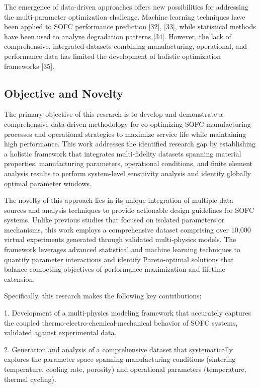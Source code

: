 \documentclass[10pt,conference]{IEEEtran}
\begin{document}
The emergence of data-driven approaches offers new possibilities for addressing the multi-parameter optimization challenge. Machine learning techniques have been applied to SOFC performance prediction [32], [33], while statistical methods have been used to analyze degradation patterns [34]. However, the lack of comprehensive, integrated datasets combining manufacturing, operational, and performance data has limited the development of holistic optimization frameworks [35].

\subsection{Objective and Novelty}

The primary objective of this research is to develop and demonstrate a comprehensive data-driven methodology for co-optimizing SOFC manufacturing processes and operational strategies to maximize service life while maintaining high performance. This work addresses the identified research gap by establishing a holistic framework that integrates multi-fidelity datasets spanning material properties, manufacturing parameters, operational conditions, and finite element analysis results to perform system-level sensitivity analysis and identify globally optimal parameter windows.

The novelty of this approach lies in its unique integration of multiple data sources and analysis techniques to provide actionable design guidelines for SOFC systems. Unlike previous studies that focused on isolated parameters or mechanisms, this work employs a comprehensive dataset comprising over 10,000 virtual experiments generated through validated multi-physics models. The framework leverages advanced statistical and machine learning techniques to quantify parameter interactions and identify Pareto-optimal solutions that balance competing objectives of performance maximization and lifetime extension.

Specifically, this research makes the following key contributions:

1. Development of a multi-physics modeling framework that accurately captures the coupled thermo-electro-chemical-mechanical behavior of SOFC systems, validated against experimental data.

2. Generation and analysis of a comprehensive dataset that systematically explores the parameter space spanning manufacturing conditions (sintering temperature, cooling rate, porosity) and operational parameters (temperature, thermal cycling).
\end{document}
